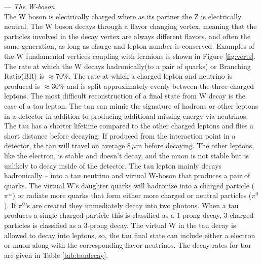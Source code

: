 --- \textit{The W-boson }\\
 The W boson is electrically charged where as its partner the Z is electrically neutral. The W boson decays through a flavor changing vertex, meaning that the particles involved in the decay vertex are always different flavors, and often the same generation, as long as charge and lepton number is conserved. Examples of the W fundamental vertices coupling with fermions is shown in Figure \ref{fig:verts}. The rate at which the W decays hadronically(to a pair of quarks) or Branching Ratio(BR) is $\approx 70\%$. The rate at which a charged lepton and neutrino is produced is $\approx30\%$ and is split approximately evenly between the three charged leptons. The most difficult reconstruction of a final state from W decay is the case of a tau lepton. The tau can mimic the signature of hadrons or other leptons in a detector in addition to producing additional missing energy via neutrinos. The tau has a shorter lifetime compared to the other charged leptons and flies a short distance before decaying. If produced from the interaction point in a detector, the tau will travel on average $8\,\mu\text{m}$ before decaying. The other leptons, like the electron, is stable and doesn't decay, and the muon is not stable but is unlikely to decay inside of the detector. The tau lepton mainly decays hadronically -- into a tau neutrino and virtual W-boson that produces a pair of quarks. The virtual W's daughter quarks will hadronize into a charged particle ($\pi^\pm$) or radiate more quarks that form either more charged or neutral particles ($\pi^0$). If $\pi^0$'s are created they immediately decay into two photons. When a tau produces a single charged particle this is classified as a 1-prong decay, 3 charged particles is classified as a 3-prong decay. The virtual W in the tau decay is allowed to decay into leptons, so, the tau final state can include either a electron or muon along with the corresponding flavor neutrinos. The decay rates for tau are given in Table \ref{tab:taudecay}.

